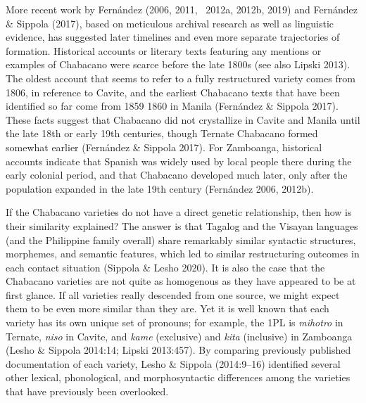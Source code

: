 \begin{styleStandard}
More recent work by Fernández (2006, 2011, \ 2012a, 2012b, 2019) and Fernández \& Sippola (2017), based on meticulous archival research as well as linguistic evidence, has suggested later timelines and even more separate trajectories of formation. Historical accounts or literary texts featuring any mentions or examples of Chabacano were scarce before the late 1800s (see also Lipski 2013). The oldest account that seems to refer to a fully restructured variety comes from 1806, in reference to Cavite, and the earliest Chabacano texts that have been identified so far come from 1859 1860 in Manila (Fernández \& Sippola 2017). These facts suggest that Chabacano did not crystallize in Cavite and Manila until the late 18th or early 19th centuries, though Ternate Chabacano formed somewhat earlier (Fernández \& Sippola 2017). For Zamboanga, historical accounts indicate that Spanish was widely used by local people there during the early colonial period, and that Chabacano developed much later, only after the population expanded in the late 19th century (Fernández 2006, 2012b). 
\end{styleStandard}

\begin{styleStandard}
If the Chabacano varieties do not have a direct genetic relationship, then how is their similarity explained? The answer is that Tagalog and the Visayan languages (and the Philippine family overall) share remarkably similar syntactic structures, morphemes, and semantic features, which led to similar restructuring outcomes in each contact situation (Sippola \& Lesho 2020). It is also the case that the Chabacano varieties are not quite as homogenous as they have appeared to be at first glance. If all varieties really descended from one source, we might expect them to be even more similar than they are. Yet it is well known that each variety has its own unique set of pronouns; for example, the 1PL is \textit{mihotro} in Ternate, \textit{niso} in Cavite, and \textit{kame} (exclusive) and \textit{kita} (inclusive) in Zamboanga (Lesho \& Sippola 2014:14; Lipski 2013:457). By comparing previously published documentation of each variety, Lesho \& Sippola (2014:9–16) identified several other lexical, phonological, and morphosyntactic differences among the varieties that have previously been overlooked. 
\end{styleStandard}

